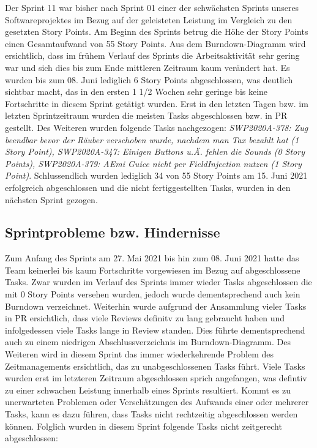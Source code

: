 \documentclass[12pt,a4paper, oneside]{article}
\begin{document}
\noindent
Der Sprint 11 war bisher nach Sprint 01 einer der schwächsten Sprints unseres Softwareprojektes im Bezug auf der geleisteten Leistung im Vergleich
zu den gesetzten Story Points. Am Beginn des Sprints betrug die Höhe der Story Points einen Gesamtaufwand von 55 Story Points.
Aus dem Burndown-Diagramm wird ersichtlich, dass im frühem Verlauf des Sprints die Arbeitsaktivität sehr gering war und sich dies bis zum Ende mittleren
Zeitraum kaum verändert hat. Es wurden bis zum 08. Juni lediglich 6 Story Points abgeschlossen, was deutlich sichtbar macht, das in den
ersten 1 1/2 Wochen sehr geringe bis keine Fortschritte in diesem Sprint getätigt wurden. Erst in den letzten Tagen bzw. im letzten Sprintzeitraum
wurden die meisten Tasks abgeschlossen bzw. in PR gestellt.
Des Weiteren wurden folgende Tasks nachgezogen: \textit{SWP2020A-378: Zug beendbar bevor der Räuber verschoben wurde, nachdem man Tax bezahlt hat (1 Story Point), SWP2020A-347: Einigen Buttons u.Ä. fehlen die Sounds (0 Story Points), SWP2020A-379: AEmi Guice nicht per FieldInjection nutzen (1 Story Point)}.
Schlussendlich wurden lediglich 34 von 55 Story Points am 15. Juni 2021 erfolgreich abgeschlossen und die nicht fertiggestellten Tasks,
wurden in den nächsten Sprint gezogen.

\newpage

\subsection{Sprintprobleme bzw. Hindernisse}

Zum Anfang des Sprints am 27. Mai 2021 bis hin zum 08. Juni 2021 hatte das Team keinerlei bis kaum Fortschritte vorgewiesen im Bezug auf
abgeschlossene Tasks. Zwar wurden im Verlauf des Sprints immer wieder Tasks abgeschlossen die mit 0 Story Points versehen wurden, jedoch wurde
dementsprechend auch kein Burndown verzeichnet. Weiterhin wurde aufgrund der Ansammlung vieler Tasks in PR ersichtlich, dass viele Reviews definitv
zu lang gebraucht haben und infolgedessen viele Tasks lange in Review standen.
Dies führte dementsprechend auch zu einem niedrigen Abschlussverzeichnis im Burndown-Diagramm.
Des Weiteren wird in diesem Sprint das immer wiederkehrende Problem des Zeitmanagements ersichtlich, das zu unabgeschlossenen Tasks führt.
Viele Tasks wurden erst im letzteren Zeitraum abgeschlossen sprich angefangen, was defintiv zu einer schwachen Leistung innerhalb eines Sprints
resultiert. Kommt es zu unerwarteten Problemen oder Verschätzungen des Aufwands einer oder mehrerer Tasks, kann es dazu führen, dass Tasks nicht
rechtzeitig abgeschlossen werden können. Folglich wurden in diesem Sprint folgende Tasks nicht zeitgerecht abgeschlossen:
\end{document}
